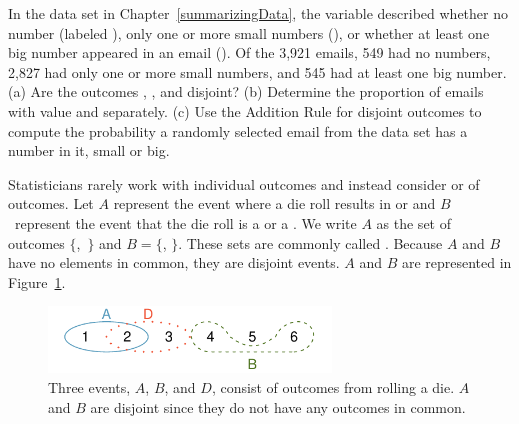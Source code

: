 \begin{exercisewrap}
\begin{nexercise}
In the  data set in Chapter~\ref{summarizingData}, the  variable described whether no number (labeled ), only one or more small numbers (), or whether at least one big number appeared in an email (). Of the 3,921 emails, 549 had no numbers, 2,827 had only one or more small numbers, and 545 had at least one big number. (a) Are the outcomes , , and  disjoint? (b) Determine the proportion of emails with value  and  separately. (c) Use the Addition Rule for disjoint outcomes to compute the probability a randomly selected email from the data set has a number in it, small or big.\footnotemark
\end{nexercise}
\end{exercisewrap}


Statisticians rarely work with individual outcomes and instead consider  or  of outcomes. Let $A$ represent the event where a die roll results in  or  and $B$~represent the event that the die roll is a  or a . We write $A$ as the set of outcomes $\{$,~$\}$ and $B=\{$, $\}$. These sets are commonly called . Because $A$ and $B$ have no elements in common, they are disjoint events. $A$ and $B$ are represented in Figure~\ref{disjointSets}.

\begin{figure}[hhh]
\centering
\includegraphics[height=0.7in]{ch_probability/figures/disjointSets/disjointSets}
\caption{Three events, $A$, $B$, and $D$, consist of outcomes from rolling a die. $A$ and $B$ are disjoint since they do not have any outcomes in common.}
\label{disjointSets}
\end{figure}

